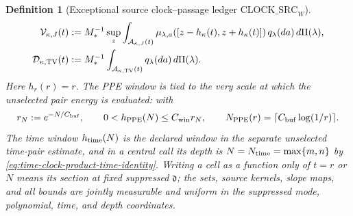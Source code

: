 \documentclass[11pt]{article}
\newtheorem{definition}[theorem]{Definition}
\begin{document}
\begin{definition}[Exceptional source clock--passage ledger
$\mathrm{CLOCK\_SRC}_{W}$]
\begin{align}
 \mathcal V_{\kappa,J}(t)&:=M_*^{-1}\sup_z
  \int_{\mathcal A_{\kappa,J}(t)}
  \mu_{\lambda,a}([z-h_\kappa(t),z+h_\kappa(t)])
  \,q_\lambda(da)\,d\Pi(\lambda),\notag\\
 \mathcal D_{\kappa,\mathrm{TV}}(t)&:=M_*^{-1}
  \int_{\mathcal A_{\kappa,\mathrm{TV}}(t)}
       q_\lambda(da)\,d\Pi(\lambda).
 \label{eq:clock-source-partition}
\end{align}
Here $h_r(r)=r$.  The PPE window is tied to the very scale at which the
unselected pair energy is evaluated: with
\begin{equation}
\label{eq:ppe-clock-window-scale}
 r_N:=e^{-N/C_{\rm buf}},\qquad
 0<h_{\rm PPE}(N)\le C_{\rm win}r_N,\qquad
 N_{\rm PPE}(r)=\lceil C_{\rm buf}\log(1/r)\rceil .
\end{equation}
The time window $h_{\rm time}(N)$ is the declared window in the separate
unselected time-pair estimate, and in a central call its depth is
$N=N_{\rm time}=\max\{m,n\}$ by
\eqref{eq:time-clock-product-time-identity}.  Writing a cell as a function
only of $t=r$ or $N$ means its section at fixed suppressed $\mathfrak d$;
the sets, source kernels, slope maps, and all bounds are jointly measurable
and uniform in the suppressed mode, polynomial, time, and depth coordinates.


\end{definition}
\end{document}
